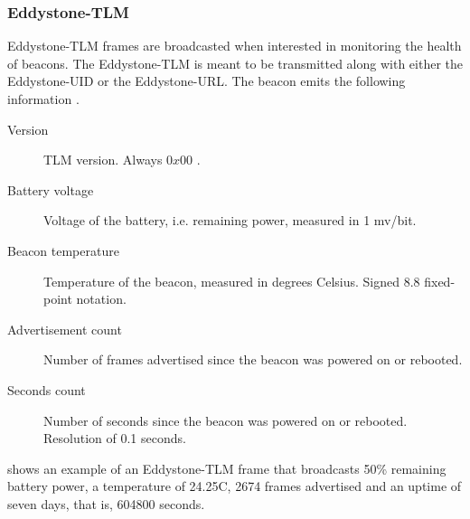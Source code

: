 \subsubsection{Eddystone-TLM}

Eddystone-TLM frames are broadcasted when interested in monitoring the health of beacons. The Eddystone-TLM is meant to be transmitted along with either the Eddystone-UID or the Eddystone-URL. The beacon emits the following information \cite{eddystone:protocol-tlm-spec}.

\begin{description}
\item[Version] TLM version. Always $0x00$ \cite{eddystone:protocol-tlm-spec}.
\item[Battery voltage] Voltage of the battery, i.e. remaining power, measured in 1 mv/bit.
\item[Beacon temperature] Temperature of the beacon, measured in degrees Celsius. Signed 8.8 fixed-point notation.
\item[Advertisement count] Number of frames advertised since the beacon was powered on or rebooted.
\item[Seconds count] Number of seconds since the beacon was powered on or rebooted. Resolution of 0.1 seconds.
\end{description}

 shows an example of an Eddystone-TLM frame that broadcasts 50\% remaining battery power, a temperature of 24.25\degree C, 2674 frames advertised and an uptime of seven days, that is, 604800 seconds.

